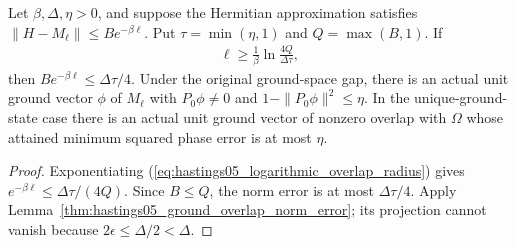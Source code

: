 \begin{lemma}
    \label{thm:hastings05_logarithmic_overlap_radius}
    \leanok
    Let $\beta,\Delta,\eta>0$, and suppose the Hermitian approximation
    satisfies $\|H-M_\ell\|\le B e^{-\beta\ell}$. Put
    $\tau=\min(\eta,1)$ and $Q=\max(B,1)$. If
    \begin{align}
        \ell\ge\frac1\beta\ln\frac{4Q}{\Delta\tau},
        \label{eq:hastings05_logarithmic_overlap_radius}
    \end{align}
    then $B e^{-\beta\ell}\le\Delta\tau/4$. Under the original ground-space
    gap, there is an actual unit ground vector $\phi$ of $M_\ell$ with
    $P_0\phi\ne0$ and $1-\|P_0\phi\|^2\le\eta$. In the unique-ground-state
    case there is an actual unit ground vector of nonzero overlap with
    $\Omega$ whose attained minimum squared phase error is at most $\eta$.
\end{lemma}
\begin{proof}\leanok
    Exponentiating (\ref{eq:hastings05_logarithmic_overlap_radius}) gives
    $e^{-\beta\ell}\le\Delta\tau/(4Q)$. Since $B\le Q$, the norm error is
    at most $\Delta\tau/4$. Apply
    Lemma~\ref{thm:hastings05_ground_overlap_norm_error}; its projection
    cannot vanish because $2\epsilon\le\Delta/2<\Delta$.
\end{proof}

